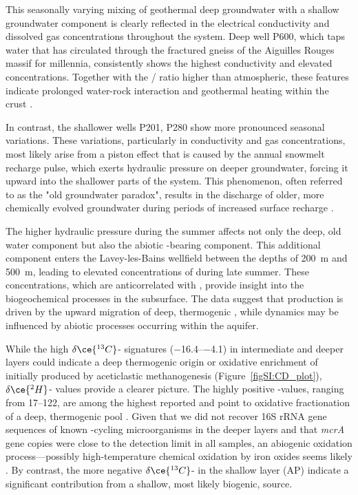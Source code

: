 This seasonally varying mixing of geothermal deep groundwater with a shallow groundwater component is clearly reflected in the electrical conductivity and dissolved gas concentrations throughout the system.
Deep well P600, which taps water that has circulated through the fractured gneiss of the Aiguilles Rouges massif for millennia, consistently shows the highest conductivity and elevated  concentrations.
Together with the / ratio higher than atmospheric, these features indicate prolonged water-rock interaction and geothermal heating within the crust \citep{torgersen1982helium}.

In contrast, the shallower wells P201, P280 show more pronounced seasonal variations.
These variations, particularly in conductivity and gas concentrations, most likely arise from a piston effect that is caused by the annual snowmelt recharge pulse, which exerts hydraulic pressure on deeper groundwater, forcing it upward into the shallower parts of the system.
This phenomenon, often referred to as the "old groundwater paradox", results in the discharge of older, more chemically evolved groundwater during periods of increased surface recharge \citep{schilling2021quantifying, mcdonnell2003where, kirchner2003double}.

The higher hydraulic pressure during the summer affects not only the deep, old water component but also the abiotic -bearing component.
This additional component enters the Lavey-les-Bains wellfield between the depths of \SI{200}{\metre} and \SI{500}{\metre}, leading to elevated concentrations of  during late summer. 
These  concentrations, which are anticorrelated with , provide insight into the biogeochemical processes in the subsurface.
The data suggest that  production is driven by the upward migration of deep, thermogenic , while  dynamics may be influenced by abiotic processes occurring within the aquifer.

While the high $\delta\ce{^{13}C}$- signatures (\SIrange{-16.4}{-4.1}{\permille}) in intermediate and deeper layers could indicate a deep thermogenic origin or oxidative enrichment of  initially produced by aceticlastic methanogenesis (Figure~\ref{figSI:CD_plot}), $\delta\ce{^{2}H}$- values provide a clearer picture.
The highly positive -values, ranging from \SIrange{17}{122}{\permille}, are among the highest reported and point to oxidative fractionation of a deep, thermogenic  pool \citep{etiope2011homorod}.
Given that we did not recover 16S rRNA gene sequences of known -cycling microorganisms in the deeper layers and that \textit{mcrA} gene copies were close to the detection limit in all samples, an abiogenic oxidation process—possibly high-temperature chemical oxidation by iron oxides seems likely \citep{etiope2011homorod}.
By contrast, the more negative $\delta\ce{^{13}C}$- in the shallow layer (AP) indicate a significant contribution from a shallow, most likely biogenic,  source.

